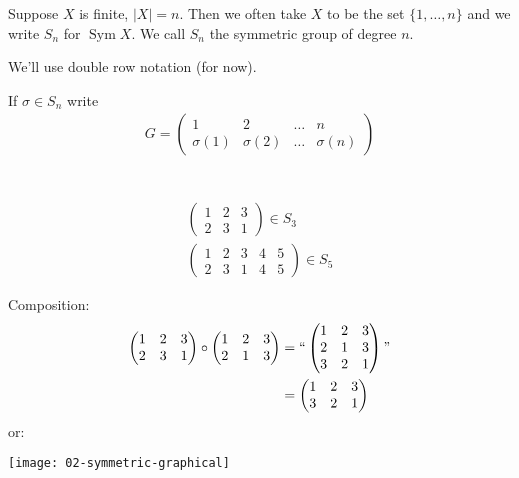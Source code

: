 \begin{notation}
Suppose $X$ is finite, $|X| = n$.
Then we often take $X$ to be the set $\{ 1, \dots, n \}$ and we write $S_n$ for $\operatorname{Sym} X$.
We call $S_n$ the symmetric group of degree $n$.
\end{notation}

\begin{notation}
We'll use double row notation (for now).

If $\sigma \in S_n$ write
\begin{align*}
  G = \begin{pmatrix}
  1 & 2 & \dots & n \\
  \sigma(1) & \sigma(2) & \dots & \sigma(n)
  \end{pmatrix} \\
\end{align*}
\end{notation} 
%
\begin{example} ~\vspace*{-1.5\baselineskip}
  \begin{align*}
    \begin{pmatrix}
    1 & 2 & 3 \\
    2 & 3 & 1
    \end{pmatrix} \in S_3 \\
    \begin{pmatrix}
    1 & 2 & 3 & 4 & 5 \\
    2 & 3 & 1 & 4 & 5
    \end{pmatrix} \in S_5
\end{align*}
\end{example} 

\begin{example}
  Composition:
\begin{align*}
    \begin{pmatrix}
    1 & 2 & 3 \\
    2 & 3 & 1
    \end{pmatrix} \circ
    \begin{pmatrix}
    1 & 2 & 3 \\
    2 & 1 & 3
    \end{pmatrix}
    &= ``\begin{pmatrix}
    1 & 2 & 3 \\
    2 & 1 & 3 \\
    3 & 2 & 1
    \end{pmatrix}" \\
    &= \begin{pmatrix}
        1 & 2 & 3 \\
        3 & 2 & 1
    \end{pmatrix}
\end{align*}
or:

{\centering \texttt{[image: 02-symmetric-graphical]}}
\end{example} 

